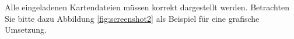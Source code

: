 
Alle eingeladenen Kartendateien m\"ussen korrekt dar\-ge\-stellt werden.
Betrachten Sie bitte dazu Abbildung \vref{fig:screenshot2} als 
Beispiel f\"ur eine grafische Umsetzung.
